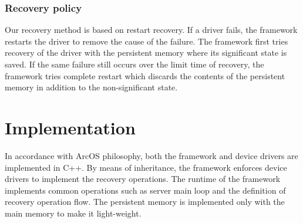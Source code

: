 \documentclass{acm_proc_article-sp}
\begin{document}




\subsubsection{Recovery policy}

Our recovery method is based on restart recovery.  If a driver fails, the framework restarts the driver to remove the cause of the failure.  The framework first tries recovery of the driver with the persistent memory where its significant state is saved.  If the same failure still occurs over the limit time of recovery, the framework tries complete restart which discards the contents of the persistent memory in addition to the non-significant state.


\section{Implementation}
\label{s:impl}

In accordance with ArcOS philosophy, both the framework and device drivers are implemented in C++.  By means of inheritance, the framework enforces device drivers to implement the recovery operations.  The runtime of the framework implements common operations such as server main loop and the definition of recovery operation flow.  The persistent memory is implemented only with the main memory to make it light-weight.
\end{document}
